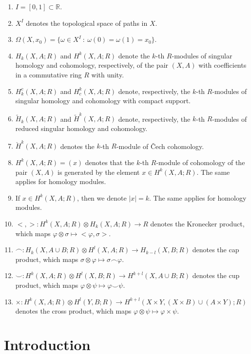 \documentclass[12pt,oneside]{book}
\newcommand{\R}{\mathbb{R}}
\newcommand{\ccup}{\smile}
\newcommand{\ccap}{\frown}
\newcommand{\tensor}{\otimes}
\newcommand{\wt}{\widetilde}
\begin{document}
\begin{enumerate}
        \item $I=[0,1]\subset \R$.
        \item $X^{I}$ denotes the topological space of paths in $X$.
        \item $\Omega(X,x_{0})=\{ \omega\in X^{I} \ : \ \omega(0)=\omega(1)=x_{0} \}$.
        \item $H_{k}(X,A;R)$ and $H^{k}(X,A;R)$ denote the $k$-th $R$-modules of singular homology and 
        cohomology, respectively, of the pair $(X,A)$ with coefficients in a commutative ring $R$ with 
        unity.
        \item $H_{k}^{c}(X,A;R)$ and $H^{k}_{c}(X,A;R)$ denote, respectively, the $k$-th $R$-modules of 
        singular homology and cohomology with compact support.
        \item $\wt{H}_{k}(X,A;R)$ and $\wt{H}^{k}(X,A;R)$ denote, respectively, the $k$-th $R$-modules of 
        reduced singular homology and cohomology.
        \item $\check{H}^{k}(X,A;R)$ denotes the $k$-th $R$-module of Čech cohomology.
        \item $H^{k}(X,A;R)=(x)$ denotes that the $k$-th $R$-module of cohomology of the pair $(X,A)$ is 
        generated by the element $x\in H^{k}(X,A;R)$. The same applies for homology modules.
        \item If $x\in H^{k}(X,A;R)$, then we denote $|x|=k$. The same applies for homology modules.
        \item $<,>:H^{k}(X,A;R)\tensor H_{k}(X,A;R)\to R$ denotes the Kronecker product, which maps 
        $\varphi\tensor\sigma\mapsto <\varphi,\sigma>$.
        \item $\ccap:H_{k}(X,A\cup B;R)\tensor H^{l}(X,A;R)\to H_{k-l}(X,B;R)$ denotes the cap product, 
        which maps $\sigma\tensor\varphi\mapsto\sigma\ccap\varphi$.
        \item $\ccup:H^{k}(X,A;R)\tensor H^{l}(X,B;R)\to H^{k+l}(X,A\cup B;R)$ denotes the cup product, 
        which maps $\varphi\tensor\psi\mapsto\varphi\ccup\psi$.
        \item $\times:H^{k}(X,A;R)\tensor H^{l}(Y,B;R)\to H^{k+l}(X\times Y,(X\times B)\cup(A\times Y);R)$ 
        denotes the cross product, which maps $\varphi\tensor\psi\mapsto\varphi\times\psi$.
        \thispagestyle{empty}
    \end{enumerate}



    \chapter{Introduction}
    \thispagestyle{empty}
\end{document}

